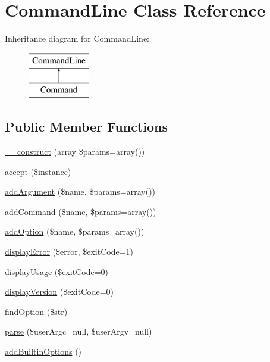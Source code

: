 \hypertarget{class_p_e_a_r2_1_1_console_1_1_command_line}{
\section{\-Command\-Line \-Class \-Reference}
\label{class_p_e_a_r2_1_1_console_1_1_command_line}
}
\-Inheritance diagram for \-Command\-Line\-:\begin{figure}[H]
\begin{center}
\leavevmode
\includegraphics[height=2.000000cm]{class_p_e_a_r2_1_1_console_1_1_command_line}
\end{center}
\end{figure}
\subsection*{\-Public \-Member \-Functions}
\begin{DoxyCompactItemize}
\item 
\hyperlink{class_p_e_a_r2_1_1_console_1_1_command_line_a85ac5b7f54ad67ec6b5b9dc282717602}{\-\_\-\-\_\-construct} (array \$params=array())
\item 
\hyperlink{class_p_e_a_r2_1_1_console_1_1_command_line_acbe2cdb774d2e2eed0c02eda2b7dcc85}{accept} (\$instance)
\item 
\hyperlink{class_p_e_a_r2_1_1_console_1_1_command_line_a7111cf9f2fcff74b790f20a95b4b2bbe}{add\-Argument} (\$name, \$params=array())
\item 
\hyperlink{class_p_e_a_r2_1_1_console_1_1_command_line_a754d690981c63bcecf9e32d96596cfed}{add\-Command} (\$name, \$params=array())
\item 
\hyperlink{class_p_e_a_r2_1_1_console_1_1_command_line_a03cc4ebc43ebb304d79fc731c73c7d5d}{add\-Option} (\$name, \$params=array())
\item 
\hyperlink{class_p_e_a_r2_1_1_console_1_1_command_line_ad9e5386ec285042822c328183f0a0e53}{display\-Error} (\$error, \$exit\-Code=1)
\item 
\hyperlink{class_p_e_a_r2_1_1_console_1_1_command_line_ade9e55935bd80bdfb3b6ebf972e1922d}{display\-Usage} (\$exit\-Code=0)
\item 
\hyperlink{class_p_e_a_r2_1_1_console_1_1_command_line_a620a8400449f7d731dc20ed9846e610e}{display\-Version} (\$exit\-Code=0)
\item 
\hyperlink{class_p_e_a_r2_1_1_console_1_1_command_line_a53158a104942261940de1d02b947695d}{find\-Option} (\$str)
\item 
\hyperlink{class_p_e_a_r2_1_1_console_1_1_command_line_abbb06a97b917ba9cef5341add43f8634}{parse} (\$user\-Argc=null, \$user\-Argv=null)
\item 
\hyperlink{class_p_e_a_r2_1_1_console_1_1_command_line_ad32057b96795668953b8e8c3397d6a90}{add\-Builtin\-Options} ()
\end{DoxyCompactItemize}
